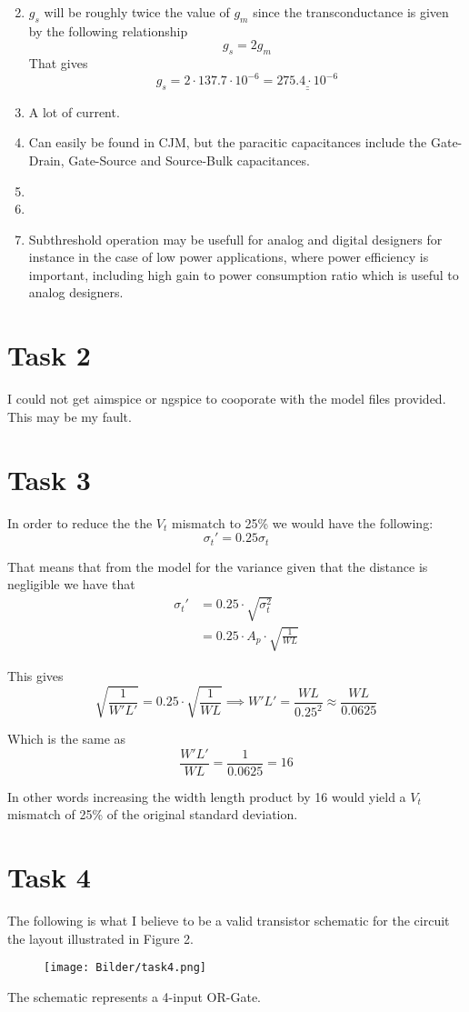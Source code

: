 \documentclass[a4paper,11pt,norsk]{article}
\begin{document}
\begin{enumerate}
\[    \]
\item $g_s$ will be roughly twice the value of $g_m$ since the transconductance is given by the following relationship
    \[
        g_s = 2 g_m
    \]
    That gives 
    \[
        g_s = 2 \cdot 137.7 \cdot 10^{-6} = \underline{\underline{275.4 \cdot 10^{-6}}}
    \]
\item A lot of current.
\item Can easily be found in CJM, but the paracitic capacitances include the Gate-Drain, Gate-Source and Source-Bulk capacitances.
\item 
\item 
\item Subthreshold operation may be usefull for analog and digital designers for instance in the case of low power applications, where 
    power efficiency is important, including high gain to power consumption ratio which is useful to analog designers.
\end{enumerate}

\section*{Task 2}
I could not get aimspice or ngspice to cooporate with the model files provided. This may be my fault.

\section*{Task 3}
In order to reduce the the $V_t$ mismatch to 25\% we would have the following:
\[
    \sigma_{t}' = 0.25 \sigma_t
\]

That means that from the model for the variance given that the distance is negligible we have that
\begin{align*}
    \sigma_{t}' &= 0.25 \cdot \sqrt{\sigma_t^2} \\
                &= 0.25 \cdot A_p \cdot \sqrt{\frac{1}{WL}}
\end{align*}

This gives 
\[
    \sqrt{\frac{1}{W' L'}} = 0.25 \cdot \sqrt{\frac{1}{WL}} \implies W'L' = \frac{WL}{0.25^2} \approx \frac{WL}{0.0625}
\]

Which is the same as
\[
    \frac{W'L'}{WL} = \frac{1}{0.0625} = 16
\]

In other words increasing the width length product by 16 would yield a $V_t$ mismatch of 25\% of the original standard deviation.

\section*{Task 4}
The following is what I believe to be a valid transistor schematic for the circuit
the layout illustrated in Figure 2.
\begin{figure}[H]
    \centering
    \texttt{[image: Bilder/task4.png]}
\end{figure}
The schematic represents a 4-input OR-Gate.
\end{document}
